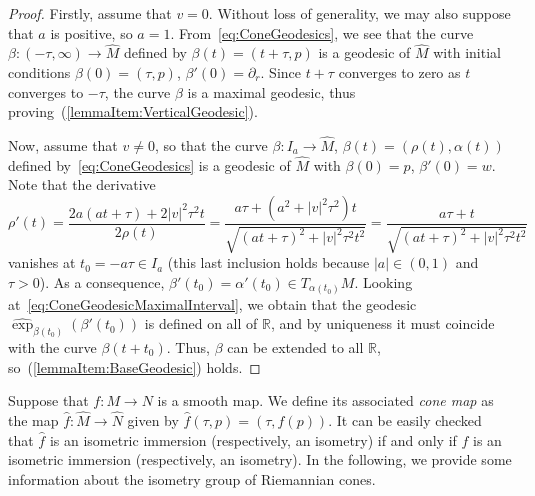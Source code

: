 \documentclass[11pt,a4paper,final]{amsart}
\newcommand{\R}{\mathbb{R}}
\renewcommand{\hat}{\widehat}
\theoremstyle{definition}
\begin{document}
\begin{proof}
	Firstly, assume that $v=0$.
	Without loss of generality, we may also suppose that $a$ is positive, so $a=1$.
	From~\eqref{eq:ConeGeodesics}, we see that the curve $\beta\colon (-\tau,\infty)\to \hat{M}$ defined by $\beta(t)=(t + \tau,p)$ is a geodesic of $\hat{M}$ with initial conditions $\beta(0)=(\tau,p)$, $\beta'(0)= \partial_{r}$.
	Since $t+\tau$ converges to zero as $t$ converges to $-\tau$, the curve $\beta$ is a maximal geodesic, thus proving~(\ref{lemmaItem:VerticalGeodesic}).
		
	Now, assume that $v\neq 0$, so that the curve $\beta\colon I_{a}\to \hat{M}$, $\beta(t)=(\rho(t),\alpha(t))$ defined by~\eqref{eq:ConeGeodesics} is a geodesic of $\hat{M}$ with $\beta(0)=p$, $\beta'(0)=w$.
	Note that the derivative
	\[
		\rho'(t)=\frac{2a(at+\tau)+2\lvert v\rvert^{2}\tau^{2}t}{2\rho(t)}=\frac{a\tau+(a^{2}+\lvert v\rvert^{2}\tau^{2})t}{\sqrt{(at+\tau)^{2}+\lvert v \rvert^{2}\tau^{2}t^{2}}}=\frac{a\tau+t}{\sqrt{(at+\tau)^{2}+\lvert v \rvert^{2}\tau^{2}t^{2}}}
	\]
	vanishes at $t_{0}=-a\tau\in I_{a}$ (this last inclusion holds because $\lvert a \rvert \in (0,1)$ and $\tau>0$).
	As a consequence, $\beta'(t_{0})=\alpha'(t_{0})\in T_{\alpha(t_{0})}M$.
	Looking at~\eqref{eq:ConeGeodesicMaximalInterval}, we obtain that the geodesic $\hat{\exp}_{\beta(t_{0})}(\beta'(t_{0}))$ is defined on all of $\R$, and by uniqueness it must coincide with the curve $\beta(t+t_{0})$.
	Thus, $\beta$ can be extended to all $\R$, so~(\ref{lemmaItem:BaseGeodesic}) holds.\qedhere
\end{proof}
Suppose that $f\colon M\to N$ is a smooth map.
We define its associated \textit{cone map} as the map $\hat{f}\colon \hat{M}\to\hat{N}$ given by $\hat{f}(\tau,p)=(\tau,f(p))$.
It can be easily checked that $\hat{f}$ is an isometric immersion (respectively, an isometry) if and only if $f$ is an isometric immersion (respectively, an isometry). In the following, we provide some information about the isometry group of Riemannian cones. 
\end{document}
